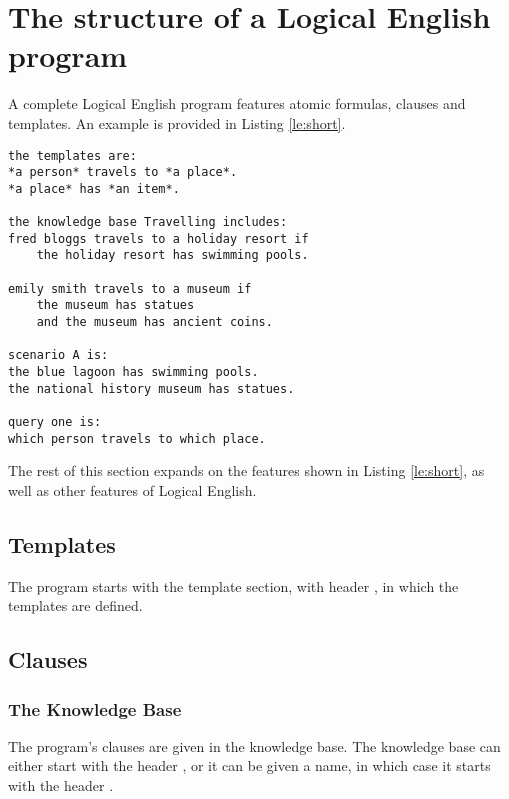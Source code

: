 \documentclass[../main.tex]{subfiles}
\begin{document}
\section{The structure of a Logical English program}
A complete Logical English program features atomic formulas, clauses and templates. An example is provided in Listing \ref{le:short}.
\newpage
\begin{lstlisting}[language={LE},caption={A short Logical English program.},label={le:short}]
the templates are:
*a person* travels to *a place*.
*a place* has *an item*.

the knowledge base Travelling includes:
fred bloggs travels to a holiday resort if 
    the holiday resort has swimming pools.

emily smith travels to a museum if
    the museum has statues 
    and the museum has ancient coins.

scenario A is:
the blue lagoon has swimming pools.
the national history museum has statues.

query one is:
which person travels to which place.
\end{lstlisting}
The rest of this section expands on the features shown in Listing \ref{le:short}, as well as other features of Logical English.
\subsection{Templates}
The program starts with the template section, with header , in which the templates are defined. 

\subsection{Clauses}
\label{section:knowledge-base}
\subsubsection{The Knowledge Base}
The program's clauses are given in the knowledge base. The knowledge base can either start with the header , or it can be given a name, in which case it starts with the header . 
\end{document}
